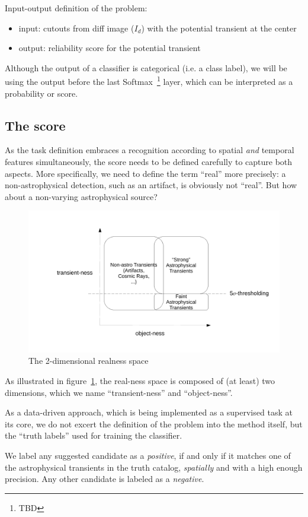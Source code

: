 Input-output definition of the problem:
\begin{itemize}
  \item input: cutouts from diff image ($I_d$) with the potential transient at the center
  \item output: reliability score for the potential transient
\end{itemize}

Although the output of a classifier is categorical (i.e. a class label), we will be using the output before the last Softmax~\footnote{TBD} layer, which can be interpreted as a probability or score.

\subsection{The score}
As the task definition embraces a recognition according to spatial \emph{and} temporal features simultaneously, the score needs to be defined carefully to capture both aspects.
More specifically, we need to define the term ``real'' more precisely: a non-astrophysical detection, such as an artifact, is obviously not ``real''. But how about a non-varying astrophysical source?

\begin{figure}[h]
  \centering
  \includegraphics[width=.8\textwidth]{material/score-space}
  \caption{The 2-dimensional realness space}
  \label{fig:score-space}
\end{figure}

As illustrated in figure~\ref{fig:score-space}, the real-ness space is composed of (at least) two dimensions, which we name ``transient-ness'' and ``object-ness''.

As a data-driven approach, which is being implemented as a supervised task at its core, we do not excert the definition of the problem into the method itself, but the ``truth labels'' used for training the classifier.
\begin{tcolorbox}
We label any suggested candidate as a \emph{positive}, if and only if it matches one of the astrophysical transients in the truth catalog, \emph{spatially} and with a high enough precision. Any other candidate is labeled as a \emph{negative}.
\end{tcolorbox}



